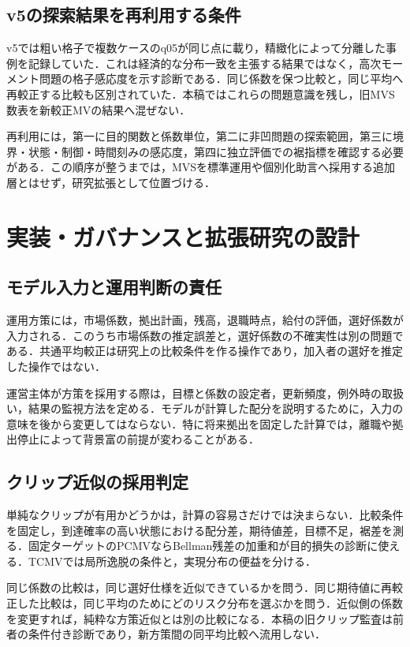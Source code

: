 \documentclass[11pt,a4paper]{article}
\numberwithin{equation}{section}
\numberwithin{table}{section}
\numberwithin{figure}{section}
\theoremstyle{plain}
\theoremstyle{definition}
\begin{document}
\subsection{v5の探索結果を再利用する条件}
v5では粗い格子で複数ケースのq05が同じ点に載り，精緻化によって分離した事例を記録していた．これは経済的な分布一致を主張する結果ではなく，高次モーメント問題の格子感応度を示す診断である．同じ係数を保つ比較と，同じ平均へ再較正する比較も区別されていた．本稿ではこれらの問題意識を残し，旧MVS数表を新較正MVの結果へ混ぜない．

再利用には，第一に目的関数と係数単位，第二に非凹問題の探索範囲，第三に境界・状態・制御・時間刻みの感応度，第四に独立評価での裾指標を確認する必要がある．この順序が整うまでは，MVSを標準運用や個別化助言へ採用する追加層とはせず，研究拡張として位置づける．

\FloatBarrier
\section{実装・ガバナンスと拡張研究の設計}
\label{app:governance}
\subsection{モデル入力と運用判断の責任}
運用方策には，市場係数，拠出計画，残高，退職時点，給付の評価，選好係数が入力される．このうち市場係数の推定誤差と，選好係数の不確実性は別の問題である．共通平均較正は研究上の比較条件を作る操作であり，加入者の選好を推定した操作ではない．

運営主体が方策を採用する際は，目標と係数の設定者，更新頻度，例外時の取扱い，結果の監視方法を定める．モデルが計算した配分を説明するために，入力の意味を後から変更してはならない．特に将来拠出を固定した計算では，離職や拠出停止によって背景富の前提が変わることがある．

\subsection{クリップ近似の採用判定}
単純なクリップが有用かどうかは，計算の容易さだけでは決まらない．比較条件を固定し，到達確率の高い状態における配分差，期待値差，目標不足，裾差を測る．固定ターゲットのPCMVならBellman残差の加重和が目的損失の診断に使える．TCMVでは局所逸脱の条件と，実現分布の便益を分ける．

同じ係数の比較は，同じ選好仕様を近似できているかを問う．同じ期待値に再較正した比較は，同じ平均のためにどのリスク分布を選ぶかを問う．近似側の係数を変更すれば，純粋な方策近似とは別の比較になる．本稿の旧クリップ監査は前者の条件付き診断であり，新方策間の同平均比較へ流用しない．
\end{document}
